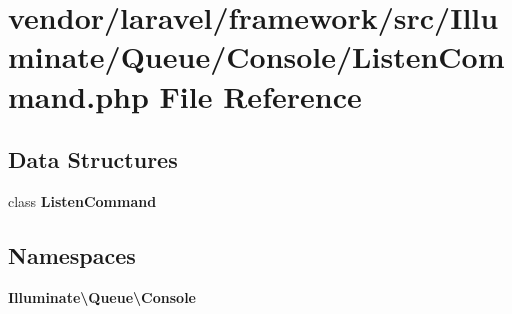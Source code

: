 \section{vendor/laravel/framework/src/\+Illuminate/\+Queue/\+Console/\+Listen\+Command.php File Reference}
\label{_listen_command_8php}
\subsection*{Data Structures}
\begin{DoxyCompactItemize}
\item 
class {\bf Listen\+Command}
\end{DoxyCompactItemize}
\subsection*{Namespaces}
\begin{DoxyCompactItemize}
\item 
 {\bf Illuminate\textbackslash{}\+Queue\textbackslash{}\+Console}
\end{DoxyCompactItemize}
